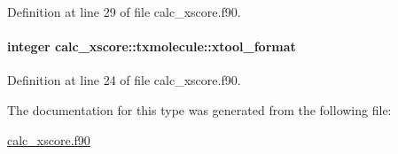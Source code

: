 Definition at line 29 of file calc\-\_\-xscore.\-f90.

\hypertarget{structcalc__xscore_1_1txmolecule_a5533bc3a6f780914549c5358f7a96230}{
\paragraph[{xtool\-\_\-format}]{\setlength{\rightskip}{0pt plus 5cm}integer calc\-\_\-xscore\-::txmolecule\-::xtool\-\_\-format}}\label{structcalc__xscore_1_1txmolecule_a5533bc3a6f780914549c5358f7a96230}


Definition at line 24 of file calc\-\_\-xscore.\-f90.



The documentation for this type was generated from the following file\-:\begin{DoxyCompactItemize}
\item 
\hyperlink{calc__xscore_8f90}{calc\-\_\-xscore.\-f90}\end{DoxyCompactItemize}
